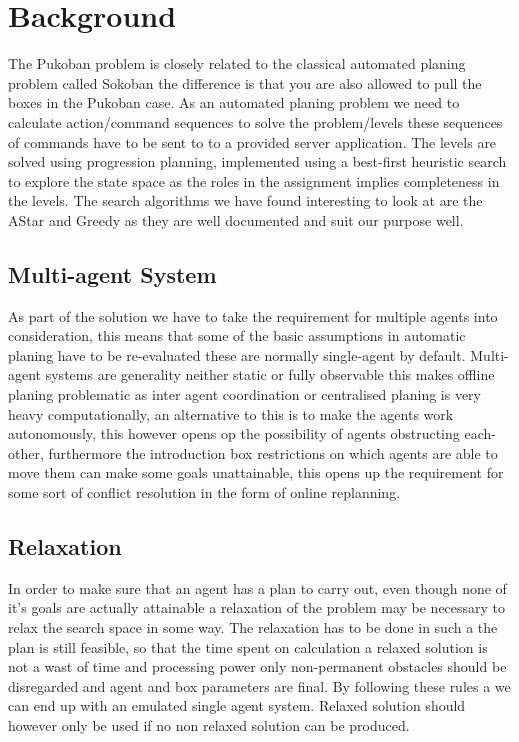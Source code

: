 \documentclass[letterpaper]{article}
\begin{document}
\section{Background}
	The Pukoban problem is closely related to the classical automated planing problem called Sokoban the difference is that you are also allowed to pull the boxes in the Pukoban case. As an automated planing problem we need to calculate action/command sequences to solve the problem/levels these sequences of commands have to be sent to to a provided server application.
	The levels are solved using progression planning, implemented using a best-first heuristic search to explore the state space as the roles in the assignment implies completeness in the levels. The search algorithms we have found interesting to look at are the AStar and Greedy as they are well documented and suit our purpose well.
	\subsection{Multi-agent System}
		As part of the solution we have to take the requirement for multiple agents into consideration, this means that some of the basic assumptions in automatic planing have to be re-evaluated these are normally single-agent by default.
		Multi-agent systems are generality neither static or fully observable this makes offline planing problematic as inter agent coordination or centralised planing is very heavy computationally, an alternative to this is to make the agents work autonomously, this however opens op the possibility of agents obstructing each-other, furthermore the introduction box restrictions on which agents are able to move them can make some goals unattainable, this opens up the requirement for some sort of conflict resolution in the form of online replanning.
	\subsection{Relaxation}
		In order to make sure that an agent has a plan to carry out, even though none of it's goals are actually attainable a relaxation of the problem may be necessary to relax the search space in some way. The relaxation has to be done in such a the plan is still feasible, so that the time spent on calculation a relaxed solution is not a wast of time and processing power only non-permanent obstacles should be disregarded and  agent and box parameters are final. By following these rules a we can end up with an emulated single agent system.
		Relaxed solution should however only be used if no non relaxed solution can be produced. 
\end{document}
